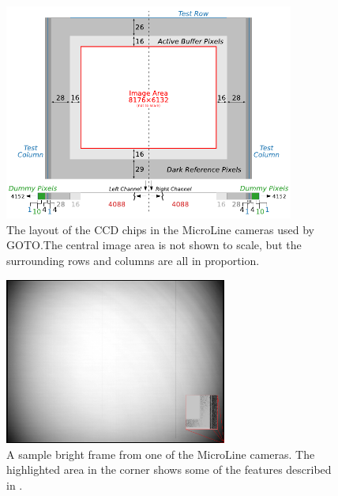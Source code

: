\begin{colsection}
\begin{colsection}
\begin{figure}[p]
    \begin{center}
        \includegraphics[width=0.85\textwidth]{images/chip}
    \end{center}
    \caption[The layout of the CCD chips in the MicroLine cameras used by GOTO]{
        The layout of the CCD chips in the MicroLine cameras used by GOTO.\@ The central image area is not shown to scale, but the surrounding rows and columns are all in proportion.
    }\label{fig:chip}
\end{figure}

\begin{figure}[p]
    \begin{center}
        \includegraphics[width=0.65\textwidth]{images/sample.png}
    \end{center}
    \caption[A sample bright frame from one of the MicroLine cameras]{
        A sample bright frame from one of the MicroLine cameras. The highlighted area in the corner shows some of the features described in .
    }\label{fig:frame}
\end{figure}


\end{colsection}
\end{colsection}
